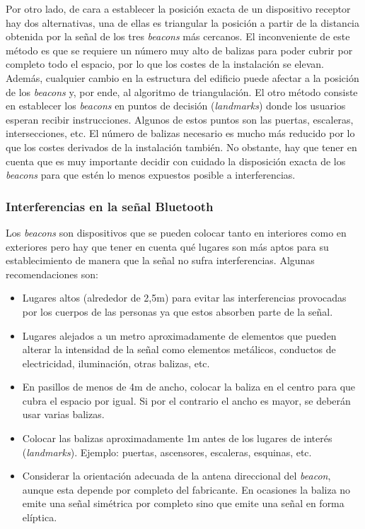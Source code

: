 Por otro lado, de cara a establecer la posición exacta de un dispositivo receptor hay dos alternativas, una de ellas es triangular la posición a partir de la distancia obtenida por la señal de los tres \textit{beacons} más cercanos. El inconveniente de este método es que se requiere un número muy alto de balizas para poder cubrir por completo todo el espacio, por lo que los costes de la instalación se elevan. Además, cualquier cambio en la estructura del edificio puede afectar a la posición de los \textit{beacons} y, por ende, al algoritmo de triangulación. El otro método consiste en establecer los \textit{beacons} en puntos de decisión (\textit{landmarks}) donde los usuarios esperan recibir instrucciones. Algunos de estos puntos son las puertas, escaleras, intersecciones, etc. El número de balizas necesario es mucho más reducido por lo que los costes derivados de la instalación también. No obstante, hay que tener en cuenta que es muy importante decidir con cuidado la disposición exacta de los \textit{beacons} para que estén lo menos expuestos posible a interferencias. 

\subsubsection{Interferencias en la señal Bluetooth}
\label{sec:Interferencias}
Los \textit{beacons} son dispositivos que se pueden colocar tanto en interiores como en exteriores pero hay que tener en cuenta qué lugares son más aptos para su establecimiento de manera que la señal no sufra interferencias. Algunas recomendaciones son:
\begin{itemize}
	\item Lugares altos (alrededor de 2,5m) para evitar las interferencias provocadas por los cuerpos de las personas ya que estos absorben parte de la señal.
	\item Lugares alejados a un metro aproximadamente de elementos que pueden alterar la intensidad de la señal como elementos metálicos, conductos de electricidad, iluminación, otras balizas, etc.
	\item En pasillos de menos de 4m de ancho, colocar la baliza en el centro para que cubra el espacio por igual. Si por el contrario el ancho es mayor, se deberán usar varias balizas.
	\item Colocar las balizas aproximadamente 1m antes de los lugares de interés (\textit{landmarks}). Ejemplo: puertas, ascensores, escaleras, esquinas, etc.
	\item Considerar la orientación adecuada de la antena direccional del \textit{beacon}, aunque esta depende por completo del fabricante. En ocasiones la baliza no emite una señal simétrica por completo sino que emite una señal en forma elíptica.
\end{itemize}

